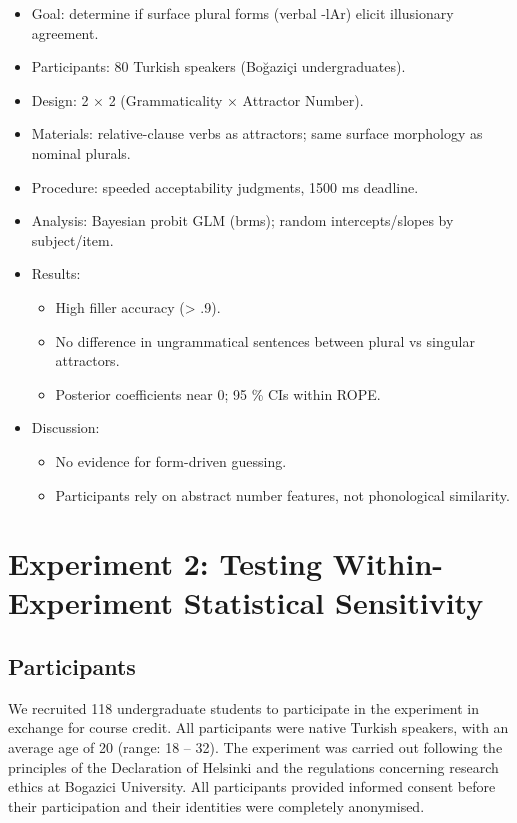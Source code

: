 \documentclass[
  authoryear,
  preprint]{elsarticle}
\providecommand{\tightlist}{%
  \setlength{\itemsep}{0pt}\setlength{\parskip}{0pt}}
\begin{document}
\begin{itemize}
\tightlist
\item
  Goal: determine if surface plural forms (verbal -lAr) elicit
  illusionary agreement.
\item
  Participants: 80 Turkish speakers (Boğaziçi undergraduates).
\item
  Design: 2 × 2 (Grammaticality × Attractor Number).
\item
  Materials: relative-clause verbs as attractors; same surface
  morphology as nominal plurals.
\item
  Procedure: speeded acceptability judgments, 1500 ms deadline.
\item
  Analysis: Bayesian probit GLM (brms); random intercepts/slopes by
  subject/item.
\item
  Results:

  \begin{itemize}
  \tightlist
  \item
    High filler accuracy (\textgreater{} .9).
  \item
    No difference in ungrammatical sentences between plural vs singular
    attractors.
  \item
    Posterior coefficients near 0; 95 \% CIs within ROPE.
  \end{itemize}
\item
  Discussion:

  \begin{itemize}
  \tightlist
  \item
    No evidence for form-driven guessing.
  \item
    Participants rely on abstract number features, not phonological
    similarity.
  \end{itemize}
\end{itemize}

\section{Experiment 2: Testing Within-Experiment Statistical
Sensitivity}\label{experiment-2-testing-within-experiment-statistical-sensitivity}

\subsection{Participants}\label{participants-1}

We recruited 118 undergraduate students to participate in the experiment
in exchange for course credit. All participants were native Turkish
speakers, with an average age of 20 (range: 18 -- 32). The experiment
was carried out following the principles of the Declaration of Helsinki
and the regulations concerning research ethics at Bogazici University.
All participants provided informed consent before their participation
and their identities were completely anonymised.
\end{document}
